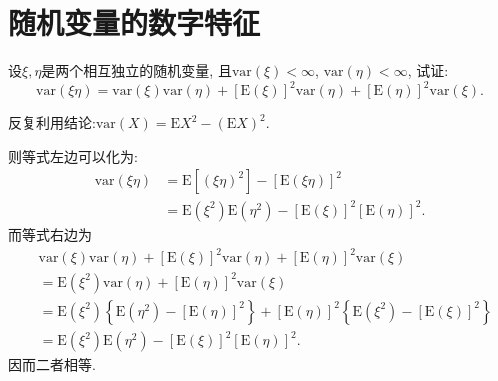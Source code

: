 \chapter{随机变量的数字特征}

	\begin{yyEx}
	设$\xi,\eta$是两个相互独立的随机变量, 且$\mathrm{var}(\xi)<\infty$, $\mathrm{var}(\eta)<\infty$, 试证:	
	\begin{equation}
	\mathrm{var}(\xi\eta) = \mathrm{var}(\xi)\mathrm{var}(\eta)+\left[ \mathrm{E}(\xi) \right]^2\mathrm{var}(\eta)+\left[ \mathrm{E}(\eta) \right]^2\mathrm{var}(\xi).
	\end{equation}
\end{yyEx}
	\begin{yyProof}
	反复利用结论:$\mathrm{var}(X) = \mathrm{E}X^2-(\mathrm{E}X)^2$.
	
	则等式左边可以化为:
	\begin{align}
	\mathrm{var}(\xi\eta) &= \mathrm{E}\left[ (\xi\eta)^2 \right] - \left[\mathrm{E}(\xi\eta)\right]^2\nonumber\\
	&=\mathrm{E}(\xi^2)\mathrm{E}(\eta^2) - \left[\mathrm{E}(\xi)\right]^2\left[\mathrm{E}(\eta)\right]^2.
	\end{align}
	而等式右边为\begin{align}
	&\mathrm{var}(\xi)\mathrm{var}(\eta)+\left[ \mathrm{E}(\xi) \right]^2\mathrm{var}(\eta)+\left[ \mathrm{E}(\eta) \right]^2\mathrm{var}(\xi)\nonumber\\
	&=\mathrm{E}\left(\xi^2 \right)\mathrm{var}(\eta)+\left[ \mathrm{E}(\eta) \right]^2\mathrm{var}(\xi)\nonumber\\
	&=\mathrm{E}\left(\xi^2 \right)\left\{ \mathrm{E}\left(\eta^2 \right) - \left[\mathrm{E}(\eta)\right]^2 \right\} + \left[ \mathrm{E}(\eta) \right]^2\left\{ \mathrm{E}\left( \xi^2 \right) - \left[\mathrm{E}(\xi)\right]^2 \right\}\nonumber\\
	&=\mathrm{E}(\xi^2)\mathrm{E}(\eta^2) - \left[\mathrm{E}(\xi)\right]^2\left[\mathrm{E}(\eta)\right]^2.
	\end{align}
	因而二者相等.
\end{yyProof}



